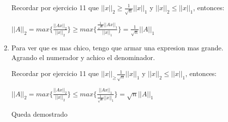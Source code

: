 \begin{enumerate}[label=(\alph*)]
\begin{enumerate}[label=(\roman*)]
            Recordar por ejercicio 11 que $||x||_2 \geq \frac{1}{\sqrt{n}} ||x||_1$ y $||x||_2 \leq  ||x||_1$, entonces:
    
            $||A||_2 = max \{\frac{||Ax||_2}{||x||_2} \} \geq  max \{\frac{\frac{1}{\sqrt{n}} ||Ax||_1}{||x||_1} \} =
            \frac{1}{\sqrt{n}} ||A||_1$
            \item
            Para ver que es mas chico, tengo que armar una expresion mas grande. Agrando el numerador y achico el denominador.
    
            Recordar por ejercicio 11 que $||x||_ \geq \frac{1}{\sqrt{n}} ||x||_1$ y $||x||_2 \leq  ||x||_1$, entonces:
    
            $||A||_2 = max \{\frac{||Ax||_2}{||x||_2} \} \leq  max \{\frac{||Ax||_1}{\frac{1}{\sqrt{n}} ||x||_1} \} =
            \sqrt{n} ||A||_1$
    
            Queda demostrado
        \end{enumerate}
    
    \end{enumerate}
    
    
    